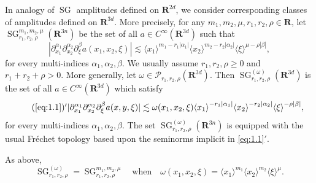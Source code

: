 \documentclass[12pt,a4paper,reqno]{amsart}
\numberwithin{equation}{section}
\numberwithin{thm}{section}
\theoremstyle{definition}
\theoremstyle{remark}
\begin{document}
In analogy of ${\operatorname{SG}}$ amplitudes defined on ${\mathbf R^{{2d}}}$, we consider
corresponding classes of amplitudes defined on ${\mathbf R^{{3d}}}$. More precisely,
for any $m_1, m_2, \mu, r_1,r_2,\rho \in \mathbf R$,
let ${\operatorname{SG}} ^{m_1,m_2,\mu }_{r_1,r_2,\rho} ({\mathbf R^{{3n}}})$ be the set of all
$a \in C^\infty \left( {\mathbf R^{{3d}}} \right )$ such that
\begin{equation}
\label{eq:1.1}       
                  |\partial ^{\alpha _1}_{x_1}
                  \partial ^{\alpha _2}_{x_2}
                   \partial _\xi ^\beta
                  a(x_1, x_2, \xi)|               
                 \lesssim
                   {\langle {x_1}\rangle}^{m_1 - r_1|\alpha _1|}
                  {\langle {x_2}\rangle}^{m_2 - r_2|\alpha _2|} {\langle {\xi}\rangle}^{\mu  - \rho |\beta |},
\end{equation}
for every multi-indices $ \alpha_1, \alpha_2, \beta$. We usually assume
$r_1,r_2,\rho \ge 0$ and $r_1+r_2+\rho>0$. More generally,  let
$\omega \in {\mathscr P} _{r_1,r_2,\rho}({\mathbf R^{{3d}}})$. Then
${\operatorname{SG}} ^{(\omega )}_{r_1,r_2,\rho} ({\mathbf R^{{3d}}})$ is the  set of all
$a \in C^\infty \left( {\mathbf R^{{3d}}} \right)$ which satisfy
\begin{equation}
\tag*{(\ref{eq:1.1})$'$}
                   |\partial ^{\alpha _1}_{x_1}
                  \partial ^{\alpha _2}_{x_2}
                   \partial _\xi ^\beta
                  a(x, y, \xi)|               
                 \lesssim
                   \omega(x_1,x_2,\xi ){\langle {x_1}\rangle}^{- r_1|\alpha _1|}
                  {\langle {x_2}\rangle}^{- r_2|\alpha _2|} {\langle {\xi}\rangle}^{- \rho |\beta |},
\end{equation}
for every multi-indices $ \alpha_1, \alpha_2, \beta$. The set
${\operatorname{SG}} ^{ (\omega) }_{r_1,r_2,\rho} ({\mathbf R^{{3n}}})$ is equipped with
the usual Fr\'{e}chet topology based upon the seminorms
implicit in \eqref{eq:1.1}$'$. 

\par

As above,
$$
{\operatorname{SG}} ^{(\omega)}_{r_1,r_2,\rho} ={\operatorname{SG}} ^{m_1,m_2,\mu }_{r_1,r_2,\rho}
\quad \text{when}\quad
\omega (x_1,x_2,\xi )={\langle {x_1}\rangle}^{m_1}{\langle {x_2}\rangle}^{m_2}{\langle \xi\rangle} ^\mu .
$$

\par
\end{document}

